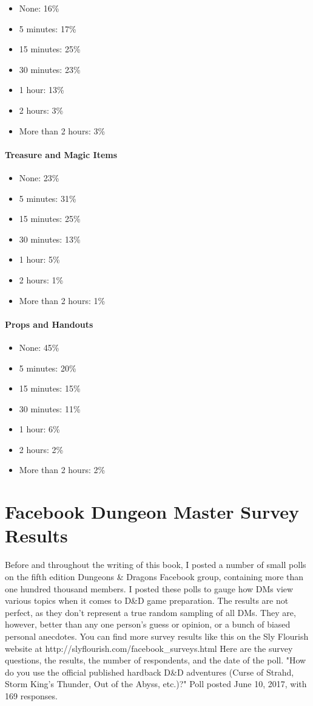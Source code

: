 \documentclass[10pt,a4paper,twoside,bg=print,twocolumn,openany,nodeprecatedcode]{dndbook}
\begin{document}
\begin{itemize}
\item None: 16\%
\item 5 minutes: 17\%
\item 15 minutes: 25\%
\item 30 minutes: 23\%
\item 1 hour: 13\%
\item 2 hours: 3\%
\item More than 2 hours: 3\%
\end{itemize}

\paragraph{Treasure and Magic Items}

\begin{itemize}
\item None: 23\%
\item 5 minutes: 31\%
\item 15 minutes: 25\%
\item 30 minutes: 13\%
\item 1 hour: 5\%
\item 2 hours: 1\%
\item More than 2 hours: 1\%
\end{itemize}

\paragraph{Props and Handouts}

\begin{itemize}
\item None: 45\%
\item 5 minutes: 20\%
\item 15 minutes: 15\%
\item 30 minutes: 11\%
\item 1 hour: 6\%
\item 2 hours: 2\%
\item More than 2 hours: 2\%
\end{itemize}

\section{Facebook Dungeon Master Survey Results}
Before and throughout the writing of this book, I posted a number of small polls on the fifth edition Dungeons \& Dragons Facebook group, containing more than one hundred thousand members. I posted these polls to gauge how DMs view various topics when it comes to D\&D game preparation.
The results are not perfect, as they don't represent a true random sampling of all DMs. They are, however, better than any one person's guess or opinion, or a bunch of biased personal anecdotes. You can find more survey results like this on the Sly Flourish website at http://slyflourish.com/facebook\_surveys.html
Here are the survey questions, the results, the number of respondents, and the date of the poll.
"How do you use the official published hardback D\&D adventures (Curse of Strahd, Storm King's Thunder, Out of the Abyss, etc.)?"
Poll posted June 10, 2017, with 169 responses.
\end{document}
